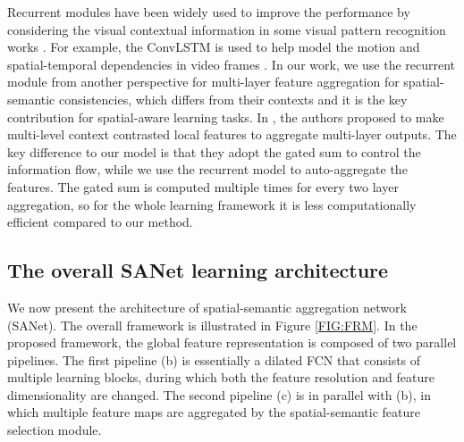 \documentclass[10pt,twocolumn,twoside]{IEEEtran}
\begin{document}
Recurrent modules have been widely used to improve the performance by considering the visual contextual information in some visual pattern recognition works \cite{CVPR18:RNN_SEG,CVPR19:TDBU,ECCV18:AAF,TPAMI:DAG}. For example, the ConvLSTM is used to help model the motion \cite{ISBI19:ML_CONVLSTM} and spatial-temporal dependencies in video frames \cite{BMVC18:FSS_CONVLSTM}. In our work, we use the recurrent module from another perspective for multi-layer feature aggregation for spatial-semantic consistencies, which differs from their contexts and it is the key contribution for spatial-aware learning tasks.  
In \cite{CVPR18:CCL}, the authors proposed to make multi-level context contrasted local features to aggregate multi-layer outputs. The key difference to our model is that they adopt the gated sum to control the information flow, while we use the recurrent model to auto-aggregate the features. The gated sum is computed multiple times for every two layer aggregation, so for the whole learning framework it is less computationally efficient compared to our method. 


\subsection{The overall SANet learning architecture}

We now present the architecture of spatial-semantic aggregation network (SANet). The overall framework is illustrated in Figure \ref{FIG:FRM}. In the proposed framework, the global feature representation is composed of two parallel pipelines. The first pipeline (b) is essentially a dilated FCN that consists of multiple learning blocks, during which both the feature resolution and feature dimensionality are changed. The second pipeline (c) is in parallel with (b), in which multiple feature maps are aggregated by the spatial-semantic feature selection module. 
\end{document}
